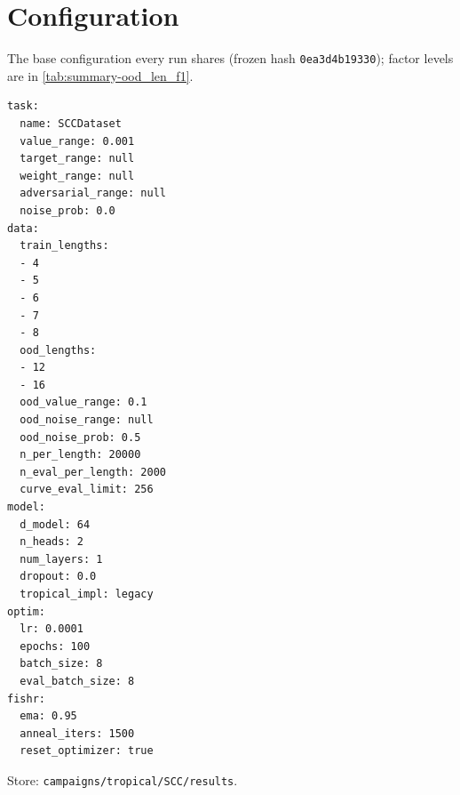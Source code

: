 \documentclass[10pt]{article}
\begin{document}
\section{Configuration}
The base configuration every run shares (frozen hash \texttt{0ea3d4b19330}); factor levels are in \autoref{tab:summary-ood_len_f1}.
{\footnotesize
\begin{verbatim}
task:
  name: SCCDataset
  value_range: 0.001
  target_range: null
  weight_range: null
  adversarial_range: null
  noise_prob: 0.0
data:
  train_lengths:
  - 4
  - 5
  - 6
  - 7
  - 8
  ood_lengths:
  - 12
  - 16
  ood_value_range: 0.1
  ood_noise_range: null
  ood_noise_prob: 0.5
  n_per_length: 20000
  n_eval_per_length: 2000
  curve_eval_limit: 256
model:
  d_model: 64
  n_heads: 2
  num_layers: 1
  dropout: 0.0
  tropical_impl: legacy
optim:
  lr: 0.0001
  epochs: 100
  batch_size: 8
  eval_batch_size: 8
fishr:
  ema: 0.95
  anneal_iters: 1500
  reset_optimizer: true
\end{verbatim}
}
Store: \texttt{campaigns/tropical/SCC/results}.
\end{document}
